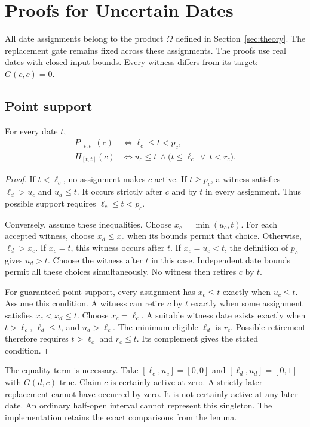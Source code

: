 \section{Proofs for Uncertain Dates}
\label{app:uncertain-proofs}

All date assignments belong to the product $\Omega$ defined in Section~\ref{sec:theory}.
The replacement gate remains fixed across these assignments.
The proofs use real dates with closed input bounds.
Every witness differs from its target: $G(c,c)=0$.

\subsection{Point support}
\begin{lemma}
\label{lem:uncertain-point}
For every date $t$,
\begin{align}
 P_{[t,t]}(c)&\iff \ell_c\leq t<p_c,\\
 H_{[t,t]}(c)&\iff u_c\leq t\ \land\bigl(t\leq\ell_c\ \lor\ t<r_c\bigr).
\end{align}
\end{lemma}
\begin{proof}
If $t<\ell_c$, no assignment makes $c$ active.
If $t\geq p_c$, a witness satisfies $\ell_d>u_c$ and $u_d\leq t$.
It occurs strictly after $c$ and by $t$ in every assignment.
Thus possible support requires $\ell_c\leq t<p_c$.

Conversely, assume these inequalities.
Choose $x_c=\min(u_c,t)$.
For each accepted witness, choose $x_d\leq x_c$ when its bounds permit that choice.
Otherwise, $\ell_d>x_c$.
If $x_c=t$, this witness occurs after $t$.
If $x_c=u_c<t$, the definition of $p_c$ gives $u_d>t$.
Choose the witness after $t$ in this case.
Independent date bounds permit all these choices simultaneously.
No witness then retires $c$ by $t$.

For guaranteed point support, every assignment has $x_c\leq t$ exactly when $u_c\leq t$.
Assume this condition.
A witness can retire $c$ by $t$ exactly when some assignment satisfies $x_c<x_d\leq t$.
Choose $x_c=\ell_c$.
A suitable witness date exists exactly when
$t>\ell_c$, $\ell_d\leq t$, and $u_d>\ell_c$.
The minimum eligible $\ell_d$ is $r_c$.
Possible retirement therefore requires $t>\ell_c$ and $r_c\leq t$.
Its complement gives the stated condition.
\end{proof}

The equality term is necessary.
Take $[\ell_c,u_c]=[0,0]$ and $[\ell_d,u_d]=[0,1]$ with $G(d,c)$ true.
Claim $c$ is certainly active at zero.
A strictly later replacement cannot have occurred by zero.
It is not certainly active at any later date.
An ordinary half-open interval cannot represent this singleton.
The implementation retains the exact comparisons from the lemma.

